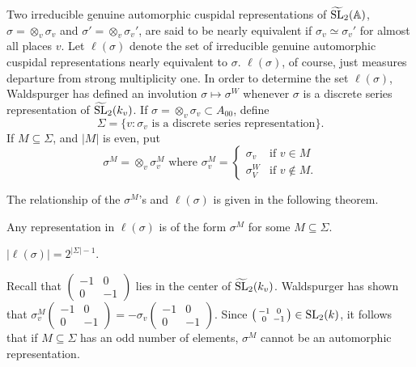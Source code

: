 Two irreducible genuine automorphic cuspidal representations of $\widetilde{\mathrm{SL}}_2(\mathbb{A})$, $\sigma = \otimes_v \sigma_v$ and $\sigma' = \otimes_v \sigma_{v}'$, are said to be nearly equivalent if $\sigma_v \simeq \sigma_v'$ for almost all places $v$.
Let $\ell(\sigma)$ denote the set of irreducible genuine automorphic cuspidal representations nearly equivalent to $\sigma$.
$\ell(\sigma)$, of course, just measures departure from strong multiplicity one.
In order to determine the set $\ell(\sigma)$, Waldspurger
has defined an involution $\sigma \mapsto \sigma^W$ whenever $\sigma$ is a discrete series representation of $\widetilde{\mathrm{SL}}_2(k_v)$.
If $\sigma = \otimes_v \sigma_v \subset A_{00}$, define
\[
\Sigma = \{ v: \sigma_v\text{ is a discrete series representation}\}.
\]
If $M \subseteq \Sigma$, and $|M|$ is even, put
\[
\sigma^M = \otimes_v \sigma_v^M \text{ where } \sigma_v^M = \begin{cases} \sigma_v & \text{if }v\in M \\ \sigma_V^W & \text{if }v \not\in M.\end{cases}
\]

The relationship of the $\sigma^M$'s and $\ell(\sigma)$ is given in the following theorem.

\begin{theorem}
\label{thm:1.3}
Any representation in $\ell(\sigma)$ is of the form $\sigma^M$ for some $M \subseteq \Sigma$.
\end{theorem}

\begin{corollary}
$|\ell(\sigma)| = 2^{|\Sigma| - 1}$.
\end{corollary}

\begin{remark*}
Recall that $\left(\begin{smallmatrix}
    -1 & 0 \\ 0 & -1
\end{smallmatrix}\right)$ lies in the center of $\widetilde{\mathrm{SL}}_2(k_v)$.
Waldspurger has shown that $\sigma_v^M\left(\begin{smallmatrix}
    -1 & 0 \\ 0 & -1
\end{smallmatrix}\right) = - \sigma_v\left(\begin{smallmatrix}
    -1 & 0 \\ 0 & -1
\end{smallmatrix}\right)$.
Since $\left(\begin{smallmatrix}
    -1 & 0 \\ 0 & -1
\end{smallmatrix}\right) \in \mathrm{SL}_2(k)$, it follows that if $M \subseteq \Sigma$ has an odd number of elements, $\sigma^M$ cannot be an automorphic representation.
\end{remark*}

